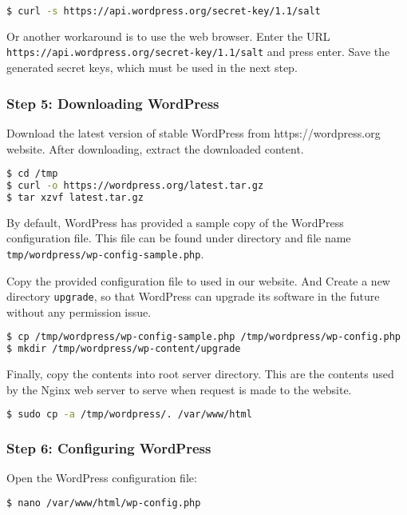 \begin{lstlisting}[language=sh]
$ curl -s https://api.wordpress.org/secret-key/1.1/salt
\end{lstlisting}

Or another workaround is to use the web browser. Enter the URL \texttt{https://api.wordpress.org/secret-key/1.1/salt} and press enter. Save the generated secret keys, which must be used in the next step.


\subsubsection*{Step 5: Downloading WordPress}
Download the latest version of stable WordPress from https://wordpress.org website. After downloading, extract the downloaded content.

\begin{lstlisting}[language=sh]
$ cd /tmp
$ curl -o https://wordpress.org/latest.tar.gz
$ tar xzvf latest.tar.gz
\end{lstlisting}

By default, WordPress has provided a sample copy of the WordPress configuration file. This file can be found under directory and file name \texttt{tmp/wordpress/wp-config-sample.php}.

Copy the provided configuration file to used in our website. And Create a new directory \texttt{upgrade}, so that WordPress can upgrade its software in the future without any permission issue.
\begin{lstlisting}[language=sh]
$ cp /tmp/wordpress/wp-config-sample.php /tmp/wordpress/wp-config.php
$ mkdir /tmp/wordpress/wp-content/upgrade
\end{lstlisting}

Finally, copy the contents into root server directory. This are the contents used by the Nginx web server to serve when request is made to the website.
\begin{lstlisting}[language=sh]
$ sudo cp -a /tmp/wordpress/. /var/www/html
\end{lstlisting}

\subsubsection*{Step 6: Configuring WordPress}
Open the WordPress configuration file:
\begin{lstlisting}[language=sh]
$ nano /var/www/html/wp-config.php
\end{lstlisting}

